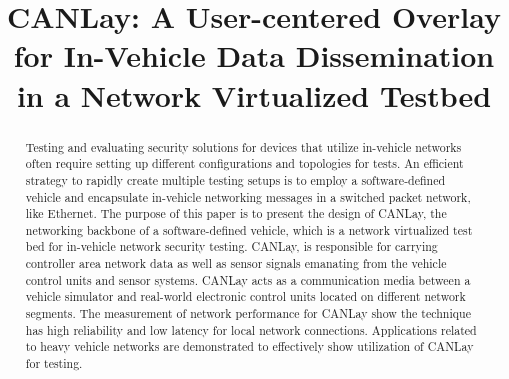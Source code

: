 \documentclass[letterpaper,twocolumn,12pt]{article}
\begin{document}

\date{}

\title{\Large \bf CANLay: A User-centered Overlay for In-Vehicle Data Dissemination in a Network Virtualized Testbed}


\maketitle

\begin{abstract}
Testing and evaluating security solutions for devices that utilize in-vehicle networks often require setting up different configurations and topologies for tests. An efficient strategy to rapidly create multiple testing setups is to employ a software-defined vehicle and encapsulate in-vehicle networking messages in a switched packet network, like Ethernet. The purpose of this paper is to present the design of CANLay, the networking backbone of a software-defined vehicle, which is a network virtualized test bed for in-vehicle network security testing. CANLay, is responsible for carrying controller area network data as well as sensor signals emanating from the vehicle control units and sensor systems. CANLay acts as a communication media between a vehicle simulator and real-world electronic control units located on different network segments. The measurement of network performance for CANLay show the technique has high reliability and low latency for local network connections. Applications related to heavy vehicle networks are demonstrated to effectively show utilization of CANLay for testing.
\end{abstract}
\end{document}
